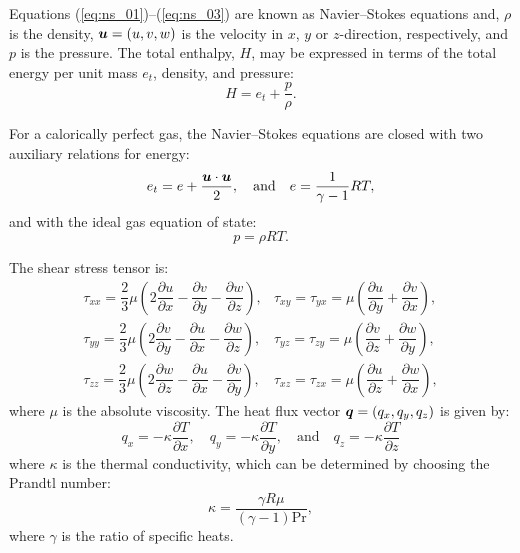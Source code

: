 \documentclass[10pt]{article}
\newcommand{\diff}[2] {\dfrac{\partial #1}{\partial #2}}
\newcommand{\bv}[1]{\ensuremath{\mbox{\boldmath$ #1 $}}}
\begin{document}
Equations (\ref{eq:ns_01})--(\ref{eq:ns_03}) are known as Navier--Stokes equations and, $\rho$ is the density, $\bv{u}=(u,v,w)$ is the velocity in $x$, $y$ or $z$-direction, respectively,    and $p$ is the pressure. The total enthalpy, $H$, may be expressed in terms of the total energy per unit mass $e_t$, density, and pressure:
$$H = e_t + \dfrac{p}{\rho}.$$ 

For a calorically perfect gas, the Navier--Stokes equations are closed with two auxiliary relations for energy:
\begin{equation}
 \label{eq:ns_04}
e_t= e+\dfrac{\bv{u}\cdot \bv{u}}{2},\quad\mbox{and}\quad e=\dfrac{1}{\gamma -1}RT ,
\end{equation}
and with the ideal gas equation of state:
\begin{equation}
 \label{eq:ns_05}
p=\rho RT.
\end{equation}

The shear stress tensor is:
\begin{equation*}
 \begin{array}{lll}
  \tau_{xx}= \dfrac{2}{3}  \mu \left( 2 \diff{u}{x} - \diff{v}{y} -\diff{w}{z} \right),
  &\tau_{xy}= \tau_{yx}=\mu \left( \diff{u}{y} + \diff{v}{x}\right),\\
  \tau_{yy}= \dfrac{2}{3}  \mu \left( 2 \diff{v}{y} - \diff{u}{x} -\diff{w}{z} \right),
  &\tau_{yz}= \tau_{zy}=\mu \left( \diff{v}{z} + \diff{w}{y}\right),\\
  \tau_{zz}= \dfrac{2}{3}  \mu \left( 2 \diff{w}{z} - \diff{u}{x} -\diff{v}{y} \right),
  &\tau_{xz}= \tau_{zx}=\mu \left( \diff{u}{z} + \diff{w}{x}\right),
 \end{array}
\end{equation*}
where $\mu$ is the absolute viscosity. The heat flux vector $\bv{q}=(q_x,q_y,q_z)$ is given by:
\begin{equation*}
 q_x = - \kappa  \diff{T}{x}, \quad q_y = - \kappa  \diff{T}{y}, \quad \mbox{and} \quad q_z = - \kappa  \diff{T}{z}
 \end{equation*}
where $\kappa $ is the thermal conductivity, which can be determined by choosing the Prandtl number:
\begin{equation}
 \label{eq:k}
\kappa = \dfrac{\gamma R \mu}{ (\gamma-1) \text{Pr}},
\end{equation}
where $\gamma$ is the ratio of specific heats.
\end{document}
